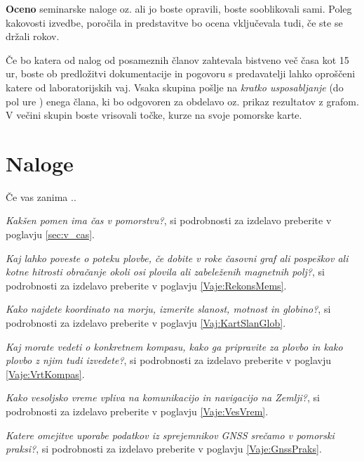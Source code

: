 \textbf{Oceno} seminarske naloge oz. ali jo boste opravili, boste sooblikovali sami. Poleg kakovosti izvedbe, poročila in predstavitve bo ocena vključevala tudi, če ste se držali rokov. 

Če bo katera od nalog od posameznih članov zahtevala bistveno več časa kot 15 ur, boste ob predložitvi dokumentacije in pogovoru s predavatelji lahko oproščeni katere od laboratorijskih vaj. Vsaka skupina pošlje na \textit{kratko usposabljanje} (do pol ure ) enega člana, ki bo odgovoren za obdelavo oz. prikaz rezultatov z grafom. V večini skupin boste vrisovali točke, kurze na svoje pomorske karte.


\section*{Naloge}
Če vas zanima ..
\begin{prob}
	\label{Nal:SplNavCas}
	 \textit{Kakšen pomen ima čas v pomorstvu?}, si podrobnosti za izdelavo preberite v poglavju \ref{sec:v_cas}.
\end{prob}

\begin{prob}
	\label{Nal:SplNavMem}
	\textit{Kaj lahko poveste o poteku plovbe, če dobite v roke časovni graf ali pospeškov ali kotne hitrosti obračanje okoli osi plovila ali zabeleženih magnetnih polj?}, si podrobnosti za izdelavo preberite v poglavju \ref{Vaje:RekonsMems}.
\end{prob}


\begin{prob}
	\label{Nal:SplNavKart}
	\textit{Kako najdete koordinato na morju, izmerite slanost, motnost in globino?}, si podrobnosti za izdelavo preberite v poglavju \ref{Vaj:KartSlanGlob}.
\end{prob}

\begin{prob}
	\label{Nal:SplNavKomp}
	\textit{Kaj morate vedeti o konkretnem kompasu, kako ga pripravite za plovbo in kako plovbo z njim tudi izvedete?}, si podrobnosti za izdelavo preberite v poglavju \ref{Vaje:VrtKompas}.
\end{prob}

\begin{prob}
	\label{Nal:SplNavVes}
	\textit{Kako vesoljsko vreme vpliva na komunikacijo in navigacijo na Zemlji?}, si podrobnosti za izdelavo preberite v poglavju \ref{Vaje:VesVrem}.  
\end{prob}

\begin{prob}
	\label{Nal:SplNavGns}
	\textit{Katere omejitve uporabe podatkov iz sprejemnikov GNSS srečamo v pomorski praksi?}, si podrobnosti za izdelavo preberite v poglavju \ref{Vaje:GnssPraks}.
\end{prob}







%

